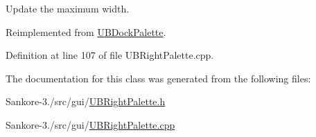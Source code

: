 Update the maximum width. 



Reimplemented from \hyperlink{class_u_b_dock_palette_aaa2875f5907c022762b4cde1ee69e961}{U\-B\-Dock\-Palette}.



Definition at line 107 of file U\-B\-Right\-Palette.\-cpp.



The documentation for this class was generated from the following files\-:\begin{DoxyCompactItemize}
\item 
Sankore-\/3./src/gui/\hyperlink{_u_b_right_palette_8h}{U\-B\-Right\-Palette.\-h}\item 
Sankore-\/3./src/gui/\hyperlink{_u_b_right_palette_8cpp}{U\-B\-Right\-Palette.\-cpp}\end{DoxyCompactItemize}
